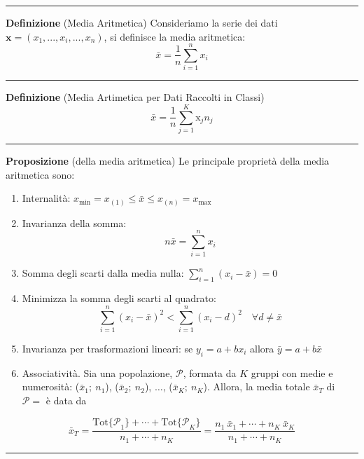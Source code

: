 \documentclass[
  11pt,
]{book}
\theoremstyle{mytheoremstyle}
\theoremstyle{mydefstyle}
\begin{document}
\normalsize

\begin{center}\rule{0.5\linewidth}{0.5pt}\end{center}

\textbf{Definizione} (Media Aritmetica)
Consideriamo la serie dei dati \(\mathbf{x}=(x_1,...,x_i,...,x_n)\), si definisce la media aritmetica:
\[
\bar x =\frac 1 n \sum_{i=1}^nx_i
\]

\begin{center}\rule{0.5\linewidth}{0.5pt}\end{center}

\textbf{Definizione} (Media Artimetica per Dati Raccolti in Classi)
\[
\bar x =\frac 1 n \sum_{j=1}^K\mathrm{x}_j n_j
\]

\begin{center}\rule{0.5\linewidth}{0.5pt}\end{center}

\textbf{Proposizione} (della media aritmetica)
Le principale proprietà della media aritmetica sono:

\begin{enumerate}
\def\labelenumi{\arabic{enumi}.}
\setcounter{enumi}{-1}
\item
  Internalità: \(x_{\min} = x_{(1)} \le \bar{x} \le x_{(n)} = x_{\max}\)
\item
  Invarianza della somma: \[n\bar x=\sum_{i=1}^n x_i\]
\item
  Somma degli scarti dalla media nulla: \(\sum_{i=1}^{n} (x_{i} - \bar{x}) = 0\)
\item
  Minimizza la somma degli scarti al quadrato:
  \[
  \sum_{i=1}^{n} (x_{i} - \bar{x})^{2} < \sum_{i=1}^{n} (x_{i} -
  d)^{2} \quad \forall d \ne \bar{x}
  \]
\item
  Invarianza per trasformazioni lineari: se \(y_i=a+bx_i\) allora \(\bar{y} = a + b \bar{x}\)
\item
  Associatività. Sia una popolazione, \(\mathscr{P}\), formata da \(K\)
  gruppi con medie e numerosità: (\(\bar{x}_{1};\ n_{1}\)),
  (\(\bar{x}_{2};\ n_{2}\)), \(\ldots\), (\(\bar{x}_{K};\ n_{K}\)). Allora,
  la media totale \(\bar{x}_{T}\) di \(\mathscr{P}=\) è data da
\end{enumerate}

\[
  \bar{x}_{T}
= \frac{\mbox{Tot}{ \{\mathscr{P}}_1\} +  \cdots +
        \mbox{Tot}{ \{\mathscr{P}}_K\}} {n_{1} + \cdots + n_{K}}
= \frac{n_{1}\ \bar{x}_{1} + \cdots + n_{K}\ \bar{x}_{K}}
       {n_{1} + \cdots + n_{K}}
\]

\begin{center}\rule{0.5\linewidth}{0.5pt}\end{center}
\end{document}
